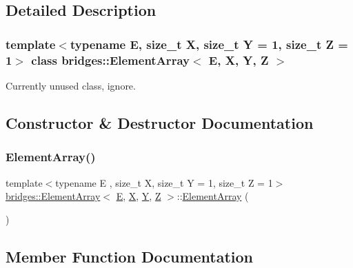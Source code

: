 \subsection{Detailed Description}
\subsubsection*{template$<$typename E, size\+\_\+t X, size\+\_\+t Y = 1, size\+\_\+t Z = 1$>$\newline
class bridges\+::\+Element\+Array$<$ E, X, Y, Z $>$}

Currently unused class, ignore. 



\subsection{Constructor \& Destructor Documentation}
\mbox{\label{classbridges_1_1_element_array_aef0cfb2b7b35cd5b368e4c3987e41768}} 
\subsubsection{\texorpdfstring{ElementArray()}{ElementArray()}}
{\footnotesize\ttfamily template$<$typename E , size\+\_\+t X, size\+\_\+t Y = 1, size\+\_\+t Z = 1$>$ \\
\mbox{\hyperlink{classbridges_1_1_element_array}{bridges\+::\+Element\+Array}}$<$ \mbox{\hyperlink{namespacebridges_acfb0a4f7877d8f63de3e6862004c50eda3a3ea00cfc35332cedf6e5e9a32e94da}{E}}, \mbox{\hyperlink{namespacebridges_acfb0a4f7877d8f63de3e6862004c50eda02129bb861061d1a052c592e2dc6b383}{X}}, \mbox{\hyperlink{namespacebridges_acfb0a4f7877d8f63de3e6862004c50eda57cec4137b614c87cb4e24a3d003a3e0}{Y}}, \mbox{\hyperlink{namespacebridges_acfb0a4f7877d8f63de3e6862004c50eda21c2e59531c8710156d34a3c30ac81d5}{Z}} $>$\+::\mbox{\hyperlink{classbridges_1_1_element_array}{Element\+Array}} (\begin{DoxyParamCaption}{ }\end{DoxyParamCaption})\hspace{0.3cm}{\ttfamily [inline]}}



\subsection{Member Function Documentation}
\mbox{\label{classbridges_1_1_element_array_adfb4e7d78ce01298ca66447e5c5abe6f}} 
